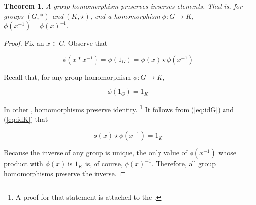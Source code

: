 \documentclass[12pt]{article}
\begin{document}
\newtheorem*{theorem}{Theorem}
\begin{theorem}
A group homomorphism preserves inverses elements. That is, for groups $(G,\ast)$ and $(K,\star)$, and a homomorphism $\phi\colon G \to K$, $\phi (x^{-1}) = \phi (x)^{-1}$.
\end{theorem}

\begin{proof}
Fix an $x \in G$. Observe that

\begin{equation}\label{eq:idG}
\phi (x \ast x^{-1}) = \phi (1_G) = \phi (x) \star \phi (x^{-1})
\end{equation}

Recall that, for any group homomorphism $\phi\colon G \to K$,

\begin{equation}\label{eq:idK}
\phi (1_G) = 1_K  
\end{equation}

In other , homomorphisms preserve identity. \footnote{A proof for that statement is attached to the .} It follows from (\ref{eq:idG}) and (\ref{eq:idK}) that

\begin{equation}
\phi (x) \star \phi (x^{-1}) = 1_K
\end{equation}

Because the inverse of any group is unique, the only value of $\phi (x^{-1})$ whose product with $\phi (x)$ is $1_K$ is, of course, $\phi (x)^{-1}$. Therefore, all group homomorphisms preserve the inverse.
\end{proof}
\end{document}
